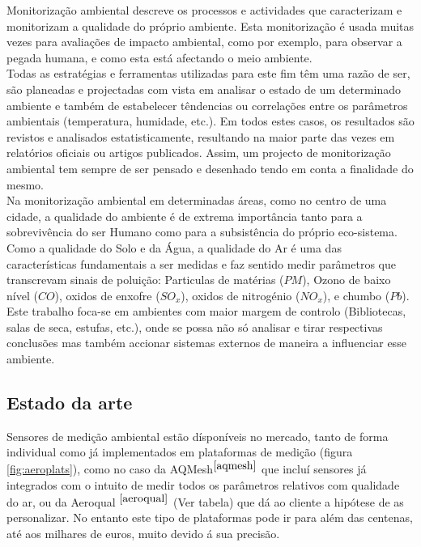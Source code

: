 \documentclass[12pt]{article}
\begin{document}
\par Monitorização ambiental descreve os processos e actividades que caracterizam e monitorizam a qualidade do próprio ambiente. Esta monitorização é usada muitas vezes para avaliações de impacto ambiental, como por exemplo, para observar a pegada humana, e como esta está afectando o meio ambiente.\\
Todas as estratégias e ferramentas utilizadas para este fim têm uma razão de ser, são planeadas e projectadas com vista em analisar o estado de um determinado ambiente e também de estabelecer têndencias ou correlações entre os parâmetros ambientais (temperatura, humidade, etc.). Em todos estes casos, os resultados são revistos e analisados estatisticamente, resultando na maior parte das vezes em relatórios oficiais ou artigos publicados.
Assim, um projecto de monitorização ambiental tem sempre de ser pensado e desenhado tendo em conta a finalidade do mesmo. \\
Na monitorização ambiental em determinadas áreas, como no centro de uma cidade, a qualidade do ambiente é de extrema importância tanto para a sobrevivência do ser Humano como para a subsistência do próprio eco-sistema. Como a qualidade do Solo e da Água, a qualidade do Ar é uma das características fundamentais a ser medidas e faz sentido medir parâmetros que transcrevam sinais de poluição: Particulas de matérias ($PM$), Ozono de baixo nível ($CO$), oxidos de enxofre ($SO_x$), oxidos de nitrogénio ($NO_x$), e chumbo ($Pb$). \\
Este trabalho foca-se em ambientes com maior margem de controlo (Bibliotecas, salas de seca, estufas, etc.), onde se possa não só analisar e tirar respectivas conclusões mas também accionar sistemas externos de maneira a influenciar esse ambiente.

\newpage
\subsection{Estado da arte}

\par Sensores de medição ambiental estão dísponíveis no mercado, tanto de forma individual como já implementados em plataformas de medição (figura \ref{fig:aeroplats}), como no caso da AQMesh$^{\cite{aqmesh}}$ que incluí sensores já integrados com o intuito de medir todos os parâmetros relativos com qualidade do ar, ou da Aeroqual $^{\cite{aeroqual}}$ (Ver tabela) que dá ao cliente a hipótese de  as personalizar. No entanto este tipo de plataformas pode ir para além das centenas, até aos milhares de euros, muito devido á sua precisão. \\
\end{document}
